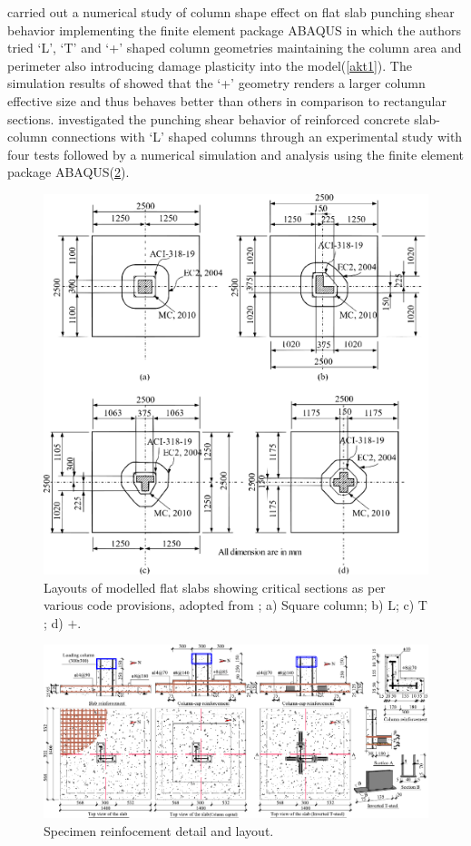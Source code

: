 \cite{akinpelu2023} carried out a numerical study of column shape effect on flat slab punching shear behavior implementing the finite element package ABAQUS\citep{abaqus} in which the authors tried `L', `T' and `+' shaped column geometries maintaining the column area and perimeter also introducing damage plasticity into the model(\ref{akt1}). The simulation results of \cite{akinpelu2023} showed that  the `+' geometry renders a larger column effective size and thus behaves better than others in comparison to rectangular sections\citep{akinpelu2023}. 
\cite{xue2022} investigated the punching shear behavior of reinforced concrete slab-column connections with `L' shaped columns through an experimental study with four tests followed by a numerical simulation and analysis using the finite element package ABAQUS(\ref{x2022f2}).
    \begin{figure}\centering
        \includegraphics[width=\columnwidth]{Figures/akf3.pdf}\caption{Layouts of modelled flat slabs showing critical sections as per various code provisions, adopted from \citep{akinpelu2023}; a) Square column; b) $\mathrm{L}$; c) $\mathrm{T}$; d) $\mathrm{+}$.}\label{akf3}
        \end{figure}
    \begin{figure}\centering
        \includegraphics[width=\textwidth]{Figures/x2022f2.pdf}\caption{Specimen reinfocement detail and layout\citep{xue2022}.}\label{x2022f2}
        \end{figure}
